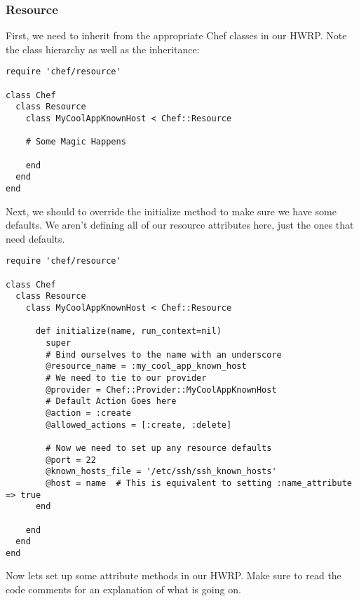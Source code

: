 \subsubsection{Resource}

First, we need to inherit from the appropriate Chef classes in our HWRP. Note the class hierarchy as well as the inheritance:

\begin{lstlisting}[label=lst:cookbook-hwrp2]
require 'chef/resource'

class Chef
  class Resource
    class MyCoolAppKnownHost < Chef::Resource

    # Some Magic Happens

    end
  end
end
\end{lstlisting}

Next, we should to override the initialize method to make sure we have some defaults. We aren't defining all of our resource attributes here, just the ones that need defaults.

\begin{lstlisting}[label=lst:cookbook-hwrp3]
require 'chef/resource'

class Chef
  class Resource
    class MyCoolAppKnownHost < Chef::Resource

      def initialize(name, run_context=nil)
        super
        # Bind ourselves to the name with an underscore
        @resource_name = :my_cool_app_known_host
        # We need to tie to our provider
        @provider = Chef::Provider::MyCoolAppKnownHost
        # Default Action Goes here
        @action = :create
        @allowed_actions = [:create, :delete]

        # Now we need to set up any resource defaults
        @port = 22
        @known_hosts_file = '/etc/ssh/ssh_known_hosts'
        @host = name  # This is equivalent to setting :name_attribute => true
      end

    end
  end
end
\end{lstlisting}

Now lets set up some attribute methods in our HWRP. Make sure to read the code comments for an explanation of what is going on.

